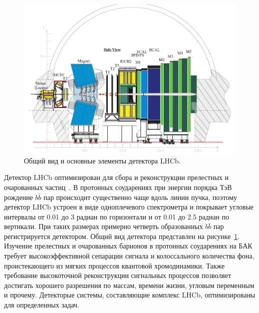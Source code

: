 \begin{figure}%
  \centering
  \includegraphics[width=.7\linewidth]{figures/lhcb-detector}
  \caption{Общий вид и основные элементы детектора LHCb.}
  \label{fig:lhcb}
\end{figure}%

Детектор LHCb оптимизирован для сбора и реконструкции прелестных 
и очарованных частиц~\cite{LHCb1, LHCb2}. В протонных соударениях при 
энергии порядка ТэВ рождение $b\bar{b}$ пар происходит существенно чаще 
вдоль линии пучка, поэтому детектор LHCb устроен в виде  одноплечевого 
спектрометра и покрывает угловые интервалы от 0.01 до 3 радиан по 
горизонтали и от 0.01 до 2.5 радиан по вертикали. При таких размерах 
примерно четверть образованных $b\bar{b}$ пар регистрируется детектором. 
Общий вид детектора представлен на рисунке~\ref{fig:lhcb}. Изучение 
прелестных и очарованных барионов в протонных соударениях на БАК требует 
высокоэффективной сепарации сигнала и колоссального количества фона, 
проистекающего из мягких процессов квантовой хромодинамики. Также 
требование высокоточной реконструкции сигнальных процессов позволяет 
достигать хорошего разрешения по массам, времени жизни, угловым 
переменным и прочему. Детекторые системы, составляющие комплекс 
LHCb, оптимизированы для определенных задач.


